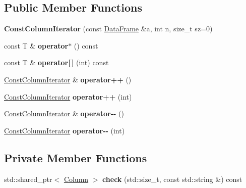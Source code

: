 \subsection*{Public Member Functions}
\begin{DoxyCompactItemize}
\item 
\mbox{\label{classDataFrame_1_1ConstColumnIterator_aae947ed7773b4dc75bab9572f5dec9ed}} 
{\bfseries Const\+Column\+Iterator} (const \hyperlink{classDataFrame}{Data\+Frame} \&a, int n, size\+\_\+t sz=0)
\item 
\mbox{\label{classDataFrame_1_1ConstColumnIterator_a3566447dd4686873cc56d0c9f9759755}} 
const T \& {\bfseries operator$\ast$} () const
\item 
\mbox{\label{classDataFrame_1_1ConstColumnIterator_a9fe179b232291b10ace5e39c9512b89a}} 
const T \& {\bfseries operator\mbox{[}$\,$\mbox{]}} (int) const
\item 
\mbox{\label{classDataFrame_1_1ConstColumnIterator_a01c8e31cd720cd852fc1045044d68865}} 
\hyperlink{classDataFrame_1_1ConstColumnIterator}{Const\+Column\+Iterator} \& {\bfseries operator++} ()
\item 
\mbox{\label{classDataFrame_1_1ConstColumnIterator_a19deac4cc676f2b54f93df10a3d89d31}} 
\hyperlink{classDataFrame_1_1ConstColumnIterator}{Const\+Column\+Iterator} {\bfseries operator++} (int)
\item 
\mbox{\label{classDataFrame_1_1ConstColumnIterator_ad9a73b33852783c9977ca6abb2db493e}} 
\hyperlink{classDataFrame_1_1ConstColumnIterator}{Const\+Column\+Iterator} \& {\bfseries operator-\/-\/} ()
\item 
\mbox{\label{classDataFrame_1_1ConstColumnIterator_a5ee96a13f1a26a51514784435d35e86c}} 
\hyperlink{classDataFrame_1_1ConstColumnIterator}{Const\+Column\+Iterator} {\bfseries operator-\/-\/} (int)
\end{DoxyCompactItemize}
\subsection*{Private Member Functions}
\begin{DoxyCompactItemize}
\item 
\mbox{\label{classDataFrame_1_1ConstColumnIterator_ad7dca2259015130616cb052e6997ba70}} 
std\+::shared\+\_\+ptr$<$ \hyperlink{classColumn}{Column} $>$ {\bfseries check} (std\+::size\+\_\+t, const std\+::string \&) const
\end{DoxyCompactItemize}
